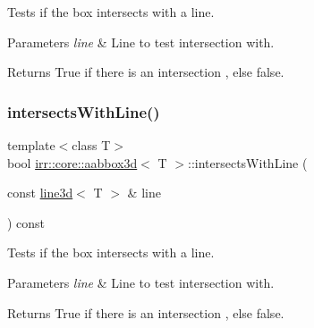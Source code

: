Tests if the box intersects with a line. 


\begin{DoxyParams}{Parameters}
{\em line} & Line to test intersection with. \\
\hline
\end{DoxyParams}
\begin{DoxyReturn}{Returns}
True if there is an intersection , else false. 
\end{DoxyReturn}
\mbox{\label{classirr_1_1core_1_1aabbox3d_ad0d7fec0145329dfca538066298fa3f2}} 
\subsubsection{\texorpdfstring{intersects\+With\+Line()}{intersectsWithLine()}\hspace{0.1cm}{\footnotesize\ttfamily [2/4]}}
{\footnotesize\ttfamily template$<$class T$>$ \\
bool \hyperlink{classirr_1_1core_1_1aabbox3d}{irr\+::core\+::aabbox3d}$<$ T $>$\+::intersects\+With\+Line (\begin{DoxyParamCaption}\item[{const \hyperlink{classirr_1_1core_1_1line3d}{line3d}$<$ T $>$ \&}]{line }\end{DoxyParamCaption}) const\hspace{0.3cm}{\ttfamily [inline]}}



Tests if the box intersects with a line. 


\begin{DoxyParams}{Parameters}
{\em line} & Line to test intersection with. \\
\hline
\end{DoxyParams}
\begin{DoxyReturn}{Returns}
True if there is an intersection , else false. 
\end{DoxyReturn}
\mbox{\label{classirr_1_1core_1_1aabbox3d_ad24417ef24e598bc484ea8b7af1c2187}} 
